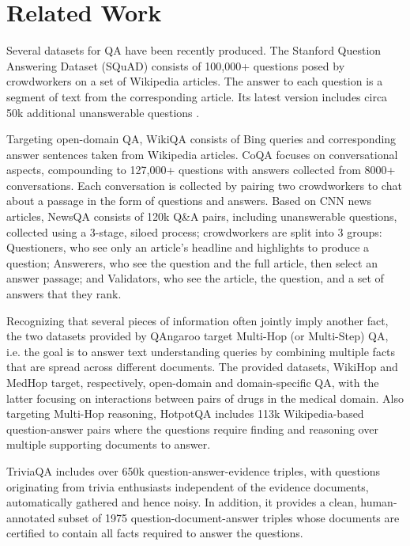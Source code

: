 \documentclass[10pt, a4paper]{article}
\begin{document}
\section{Related Work}
\label{sec:related_work}

Several datasets for QA have been recently produced. The Stanford Question Answering Dataset (SQuAD) \cite{rajpurkar2016squad} consists of 100,000+ questions posed by crowdworkers on a set of Wikipedia articles. The answer to each question is a segment of text from the corresponding article. Its latest version includes circa 50k additional unanswerable questions \cite{rajpurkar2018know}.

Targeting open-domain QA, WikiQA \cite{yang2015wikiqa} consists of Bing queries and corresponding answer sentences taken from Wikipedia articles. CoQA \cite{reddy2018coqa} focuses on conversational aspects, compounding to 127,000+ questions with answers collected from 8000+ conversations. Each conversation is collected by pairing two crowdworkers to chat about a passage in the form of questions and answers. Based on CNN news articles, NewsQA \cite{trischler2017newsqa} consists of 120k Q\&A pairs, including unanswerable questions, collected using a 3-stage, siloed process; crowdworkers are split into 3 groups: Questioners, who see only an article's headline and highlights to produce a question; Answerers, who see the question and the full article, then select an answer passage; and Validators, who see the article, the question, and a set of answers that they rank. 

Recognizing that several pieces of information often jointly imply another fact, the two datasets provided by QAngaroo \cite{welbl2018constructing} target Multi-Hop (or Multi-Step) QA, i.e. the goal is to answer text understanding queries by combining multiple facts that are spread across different documents. The provided datasets, WikiHop and MedHop target, respectively, open-domain and domain-specific QA, with the latter focusing on interactions between pairs of drugs in the medical domain. Also targeting Multi-Hop reasoning, HotpotQA \cite{yang2018hotpotqa} includes 113k Wikipedia-based question-answer pairs where the questions require finding and reasoning over multiple supporting documents to answer.

TriviaQA \cite{joshi2017triviaqa} includes over 650k question-answer-evidence triples, with questions originating from trivia enthusiasts independent of the evidence documents, automatically gathered and hence noisy. In addition, it provides a clean, human-annotated subset of 1975 question-document-answer triples whose documents are certified to contain all facts required to answer the questions.
\end{document}
